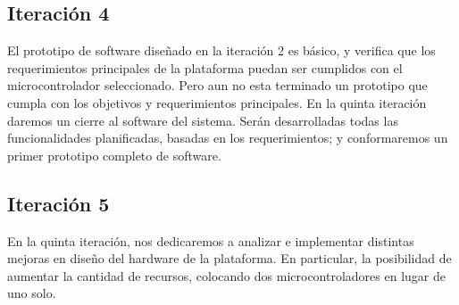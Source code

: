 \subsection{Iteración 4} %
\label{sub:iteracion_4}

El prototipo de software diseñado en la iteración 2 es básico, y verifica que los requerimientos principales de la plataforma puedan ser cumplidos con el microcontrolador seleccionado. Pero aun no esta terminado un prototipo que cumpla con los objetivos y requerimientos principales. En la quinta iteración daremos un cierre al software del sistema. Serán desarrolladas todas las funcionalidades planificadas, basadas en los requerimientos; y conformaremos un primer prototipo completo de software.


\subsection{Iteración 5} %
\label{sub:iteracion_5}

En la quinta iteración, nos dedicaremos a analizar e implementar distintas mejoras en diseño del hardware de la plataforma. En particular, la posibilidad de aumentar la cantidad de recursos, colocando dos microcontroladores en lugar de uno solo.


